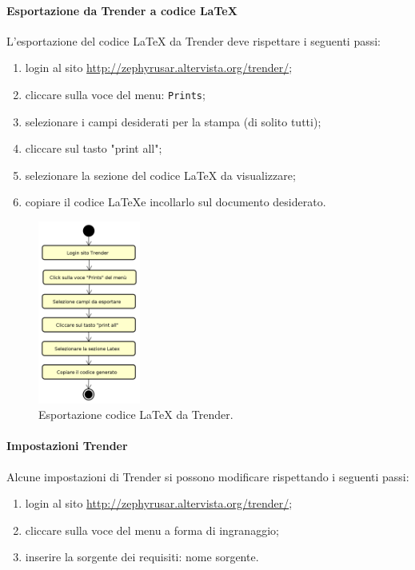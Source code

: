 		\paragraph{Esportazione da Trender a codice \LaTeX}
		L'esportazione del codice \LaTeX{} da Trender deve rispettare i seguenti passi:
		\begin{enumerate}
			\item login al sito \url{http://zephyrusar.altervista.org/trender/};
			\item cliccare sulla voce del menu: \texttt{Prints};
			\item selezionare i campi desiderati per la stampa (di solito tutti);
			\item cliccare sul tasto "print all";
			\item selezionare la sezione del codice \LaTeX{} da visualizzare;
			\item copiare il codice \LaTeX e incollarlo sul documento desiderato.
		\end{enumerate}
		\begin{figure}[H]
			\centering
			\includegraphics[width=0.3\textwidth]{img/Export}
			\caption{Esportazione codice \LaTeX{} da Trender.}
		\end{figure}
		
		\paragraph{Impostazioni Trender}
		Alcune impostazioni di Trender si possono modificare rispettando i seguenti passi:
		\begin{enumerate}
			\item login al sito \url{http://zephyrusar.altervista.org/trender/};
			\item cliccare sulla voce del menu a forma di ingranaggio;
			\item inserire la sorgente dei requisiti: nome sorgente.
		\end{enumerate}
		

